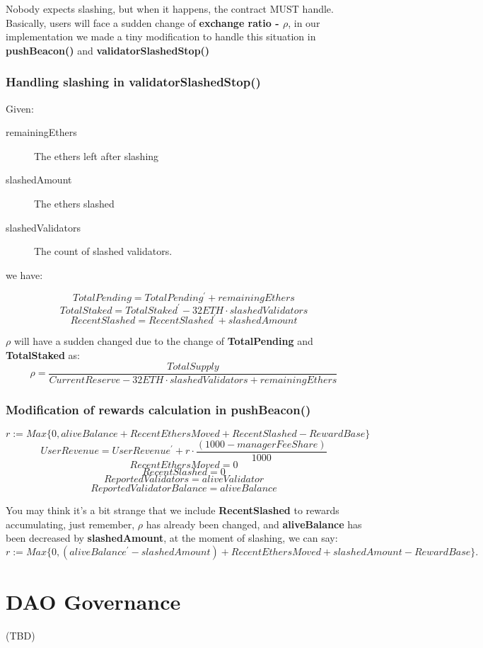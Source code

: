 \documentclass{article}
\begin{document}
Nobody expects slashing, but when it happens, the contract MUST handle. Basically, users will face a sudden change of \textbf{exchange ratio - $\rho$}, in our implementation we made a tiny modification to handle this situation in \textbf{pushBeacon()} and \textbf{validatorSlashedStop()}

\subsubsection{Handling slashing in validatorSlashedStop()}
Given:
\begin{description}
\item[remainingEthers] The ethers left after slashing
\item[slashedAmount] The ethers slashed
\item[slashedValidators] The count of slashed validators.
\end{description}
we have:
\begin{theorem}
\[TotalPending = TotalPending^{\prime} + remainingEthers \]
\[TotalStaked = TotalStaked^{\prime} - 32 ETH \cdot slashedValidators \]
\[RecentSlashed = RecentSlashed^{\prime} +  slashedAmount \]
\end{theorem}

$\rho$ will have a sudden changed due to the change of \textbf{TotalPending} and \textbf{TotalStaked} as:
\[\rho = \frac{TotalSupply}{CurrentReserve - 32 ETH \cdot slashedValidators + remainingEthers } \]

\subsubsection{Modification of rewards calculation in pushBeacon()}
\begin{theorem}
\[r := Max\{0, aliveBalance + RecentEthersMoved + RecentSlashed - RewardBase\}\]
\[UserRevenue = UserRevenue^{\prime} + r \cdot \frac{(1000 - managerFeeShare)}{1000}\]
\[RecentEthersMoved = 0\]
\[RecentSlashed = 0\]
\[ReportedValidators = aliveValidator\]
\[ReportedValidatorBalance = aliveBalance\]
\end{theorem}
You may think it's a bit strange that we include \textbf{RecentSlashed} to rewards accumulating, just remember, $\rho$ has already been changed, and 
\textbf{aliveBalance} has been decreased by \textbf{slashedAmount},  at the moment of slashing, we can say:
\[r := Max\{0, (aliveBalance^{\prime} - slashedAmount) + RecentEthersMoved + slashedAmount - RewardBase\}. \]

\section{DAO Governance}
(TBD)
\end{document}
